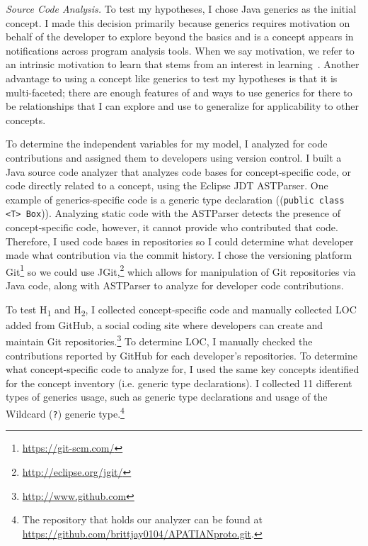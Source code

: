 \documentclass{llncs}
\begin{document}
\vspace{0.5em}
\noindent\textit{Source Code Analysis.}
To test my hypotheses, I chose Java generics as the initial concept. I made this decision primarily because generics requires motivation on behalf of the developer to explore beyond the basics and is a concept appears in notifications across program analysis tools. When we say motivation, we refer to an intrinsic motivation to learn that stems from an interest in learning~\cite{krapp1999interest,hall2008we}.		
Another advantage to using a concept like generics to test my hypotheses is that it is multi-faceted; there are enough features of and ways to use generics for there to be relationships that I can explore and use to generalize for applicability to other concepts.

To determine the independent variables for my model, I analyzed for code contributions and assigned them to developers using version control. 
I built a Java source code analyzer that analyzes code bases for concept-specific code, or code directly related to a concept, using the Eclipse JDT ASTParser. 
One example of generics-specific code is a generic type declaration ((\texttt{public class <T> Box})).
Analyzing static code with the ASTParser detects the presence of concept-specific code, however, it cannot provide who contributed that code. 	
Therefore, I used code bases in repositories so I could determine what developer made what contribution via the commit history. 
I chose the versioning platform Git\footnote{\url{https://git-scm.com/}} so we could use JGit,\footnote{\url{http://eclipse.org/jgit/}} which allows for manipulation of Git repositories via Java code, along with ASTParser to analyze for developer code contributions.

To test H\textsubscript{1} and H\textsubscript{2}, I collected concept-specific code and manually collected LOC added from GitHub, a social coding site where developers can create and maintain Git repositories.\footnote{\url{http://www.github.com}} To determine LOC, I manually checked the contributions reported by GitHub for each developer's repositories. To determine what concept-specific code to analyze for, I used the same key concepts identified for the concept inventory (i.e. generic type declarations). I collected 11 different types of generics usage, such as generic type declarations and usage of the Wildcard (\texttt{?}) generic type.\footnote{The repository that holds our analyzer can be found at \url{https://github.com/brittjay0104/APATIANproto.git}.}
\end{document}
